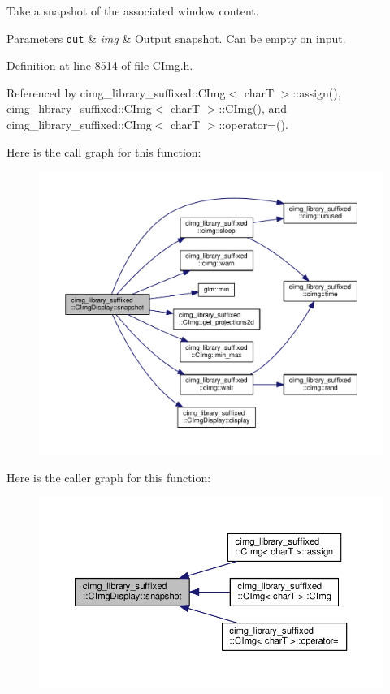 Take a snapshot of the associated window content. 


\begin{DoxyParams}[1]{Parameters}
\mbox{\tt out}  & {\em img} & Output snapshot. Can be empty on input. \\
\hline
\end{DoxyParams}


Definition at line 8514 of file C\+Img.\+h.



Referenced by cimg\+\_\+library\+\_\+suffixed\+::\+C\+Img$<$ char\+T $>$\+::assign(), cimg\+\_\+library\+\_\+suffixed\+::\+C\+Img$<$ char\+T $>$\+::\+C\+Img(), and cimg\+\_\+library\+\_\+suffixed\+::\+C\+Img$<$ char\+T $>$\+::operator=().

Here is the call graph for this function\+:
\nopagebreak
\begin{figure}[H]
\begin{center}
\leavevmode
\includegraphics[width=350pt]{d5/d53/structcimg__library__suffixed_1_1CImgDisplay_a914ee0515249db301dc66275861a6b3e_cgraph}
\end{center}
\end{figure}
Here is the caller graph for this function\+:
\nopagebreak
\begin{figure}[H]
\begin{center}
\leavevmode
\includegraphics[width=350pt]{d5/d53/structcimg__library__suffixed_1_1CImgDisplay_a914ee0515249db301dc66275861a6b3e_icgraph}
\end{center}
\end{figure}
